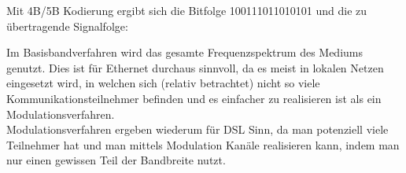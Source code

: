 \documentclass{../exercisesheet}
\begin{document}
\begin{exercise}{5}
	\begin{subexercise}
	Mit 4B/5B Kodierung ergibt sich die Bitfolge 100111011010101 und die zu übertragende Signalfolge:
	\begin{figure}[H]
		\centering
	\end{figure}
	\end{subexercise}

	\begin{subexercise} 
		Im Basisbandverfahren wird das gesamte Frequenzspektrum des Mediums genutzt. Dies ist für Ethernet durchaus sinnvoll, da es meist in lokalen Netzen
		eingesetzt wird, in welchen sich (relativ betrachtet) nicht so viele Kommunikationsteilnehmer befinden und es einfacher zu realisieren ist als ein Modulationsverfahren.\\
		Modulationsverfahren ergeben wiederum für DSL Sinn, da man potenziell viele Teilnehmer hat und man mittels Modulation Kanäle realisieren kann, indem man nur
		einen gewissen Teil der Bandbreite nutzt.
	\end{subexercise}
\end{exercise}
\end{document}
